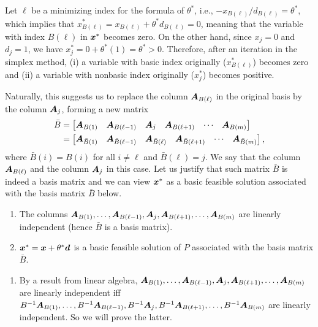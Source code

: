 \begin{enumerate}
Let \(\ell\) be a minimizing index for the formula of \(\theta^{*}\), i.e.,
\(-x_{B(\ell)}/d_{B(\ell)} =\theta^{*}\), which implies that
\(x_{B(\ell)}^{*}=x_{B(\ell)}+\theta^{*}d_{B(\ell)}=0\), meaning that the
variable with index \(B(\ell)\) in \(\bm{x}^*\) becomes zero.  On the other
hand, since \(x_j=0\) and \(d_j=1\), we have
\(x_j^{*}=0+\theta^{*}(1)=\theta^{*}>0\). Therefore, after an iteration in the
simplex method, (i) a variable with basic index originally
(\(x_{B(\ell)}^{*}\)) becomes zero and (ii) a variable with nonbasic index
originally (\(x_j^{*}\)) becomes positive.

Naturally, this suggests us to replace the column \(\bm{A}_{B(\ell)}\) in the
original basis by the column \(\bm{A}_j\), forming a new matrix
\begin{align*}
\bar{B}&=\begin{bmatrix}
\bm{A}_{B(1)}&\bm{A}_{B(\ell -1)}&\bm{A}_j&\bm{A}_{B(\ell+1)}&\cdots&\bm{A}_{B(m)}
\end{bmatrix} \\
&=\begin{bmatrix}
\bm{A}_{\bar{B}(1)}&\bm{A}_{\bar{B}(\ell -1)}&\bm{A}_{\bar{B}(\ell)}&\bm{A}_{\bar{B}(\ell+1)}
&\cdots&\bm{A}_{\bar{B}(m)}
\end{bmatrix},
\end{align*}
where \(\bar{B}(i)=B(i)\) for all \(i\ne\ell\) and \(\bar{B}(\ell)=j\).
We say that the column
\(\bm{A}_{B(\ell)}\)  and the column \(\bm{A}_j\)
 in this case. Let us justify that such matrix
\(\bar{B}\) is indeed a basis matrix and we can view \(\bm{x}^*\) as a basic
feasible solution associated with the basis matrix \(\bar{B}\) below.

\begin{proposition}
\label{prp:change-of-basis-simplex}
\hfill
\begin{enumerate}
\item The columns
\(\bm{A}_{B(1)},\dotsc,\bm{A}_{B(\ell-1)},\bm{A}_j,\bm{A}_{B(\ell+1)},\dotsc,\bm{A}_{B(m)}\)
are linearly independent (hence \(\bar{B}\) is a basis matrix).
\item \(\bm{x}^*=\bm{x}+\theta^{*}\bm{d}\) is a basic feasible solution
of \(P\) associated with the basis matrix \(\bar{B}\).
\end{enumerate}
\end{proposition}
\begin{pf}
\begin{enumerate}
\item By a result from linear algebra,
\(\bm{A}_{B(1)},\dotsc,\bm{A}_{B(\ell-1)},\bm{A}_j,\bm{A}_{B(\ell+1)},\dotsc,\bm{A}_{B(m)}\)
are linearly independent iff \(B^{-1}\bm{A}_{B(1)},\dotsc,B^{-1}\bm{A}_{B(\ell-1)},
B^{-1}\bm{A}_j,B^{-1}\bm{A}_{B(\ell+1)},\dotsc,B^{-1}\bm{A}_{B(m)}\) are
linearly independent. So we will prove the latter.


\end{enumerate}
\end{pf}
\end{enumerate}
